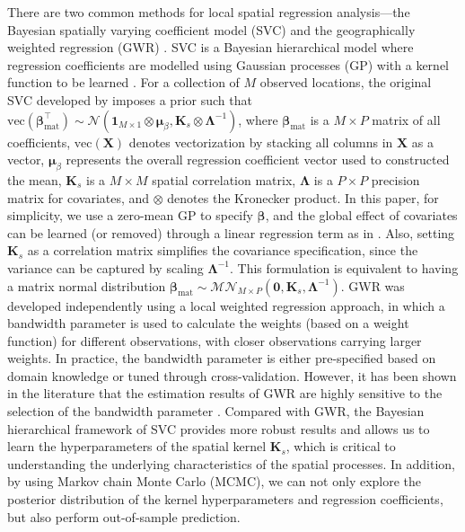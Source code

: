 \documentclass[12pt]{article}
\newcommand{\bd}[1]{\boldsymbol{#1}}
\begin{document}
There are two common methods for local spatial regression analysis---the Bayesian spatially varying coefficient model (SVC) \citep{gelfand2003spatial} and the geographically weighted regression (GWR) \citep{fotheringham2003geographically}. SVC is a Bayesian hierarchical model where regression coefficients are modelled using Gaussian processes (GP) with a kernel function to be learned \citep{rasmussen2006}. For a collection of $M$ observed locations, the original SVC 
 developed by \citet{gelfand2003spatial} imposes a prior such that $\text{vec}(\bd{\beta}_{\text{mat}}^{\top})\sim \mathcal{N} (\bd{1}_{M\times 1}\otimes\bd{\mu}_{\beta}, \bd{K}_s\otimes \bd{\Lambda}^{-1})$, where $\bd{\beta}_{\text{mat}}$ is a $M\times P$ matrix of all coefficients, $\text{vec}(\bd{X})$ denotes vectorization by stacking all columns in $\bd{X}$ as a vector, $\bd{\mu}_{\beta}$ represents the overall regression coefficient vector used to constructed the mean, 
 $\bd{K}_s$ is a $M\times M$ spatial correlation matrix, $\bd{\Lambda}$ is a $P\times P$ precision matrix for covariates, and $\otimes$ denotes the Kronecker product. 
 In this paper, for simplicity, we use a zero-mean GP to specify $\bd{\beta}$, and the global effect of covariates can be learned (or removed) through a linear regression term as in \citet{gelfand2003spatial}. Also, setting $\bd{K}_s$ as a correlation matrix simplifies the covariance specification, since the variance can be captured by scaling $\bd{\Lambda}^{-1}$. This formulation is equivalent to having a matrix normal distribution $\bd{\beta}_{\text{mat}}\sim \mathcal{MN}_{M\times P}\left(\bd{0},\bd{K}_s,\bd{\Lambda}^{-1}\right)$. GWR was developed independently using a local weighted regression approach, in which a bandwidth parameter is used to calculate the weights (based on a weight function) for different observations, with closer observations carrying larger weights. In practice, the bandwidth parameter is either pre-specified based on domain knowledge or tuned through cross-validation. However, it has been shown in the literature that the estimation results of GWR are highly sensitive to the selection of the bandwidth parameter \citep[e.g.,][]{finley2011comparing}. Compared with GWR, the Bayesian hierarchical framework of SVC provides more robust results and allows us to learn the hyperparameters of the spatial kernel $\bd{K}_s$, which is critical to understanding the underlying characteristics of the spatial processes. In addition, by using Markov chain Monte Carlo (MCMC), we can not only explore the posterior distribution of the kernel hyperparameters and regression coefficients, but also perform out-of-sample prediction. 
\end{document}
